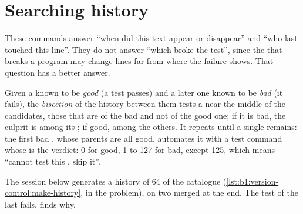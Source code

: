 \section{Searching history}\label{sec:b1:version-control:history}

\label{out:b1:version-control:search}

These commands answer ``when did this text appear or disappear'' and ``who last touched this line''. They do not answer
``which  broke the test'', since the  that breaks a program may change lines far from where the failure
shows. That question has a better answer.

\begin{definition}\label{def:b1:version-control:bisection}
Given a  known to be \emph{good} (a test passes) and a later one known to be \emph{bad} (it fails), the
\emph{bisection} of the history between them tests a  near the middle of the
candidates, those that are  of the bad  and not of the good one; if it is bad, the culprit is among its
; if good, among the others. It repeats until a single  remains: the first bad , whose parents are
all good.  automates it with a test command whose  is the verdict: 0 for good, 1 to 127
for bad, except 125, which means ``cannot test this , skip it''.
\end{definition}

The session below generates a history of 64  of the catalogue (\cref{lst:b1:version-control:make-history}, in the
problem), on two  merged at the end. The test  of the last  fails.  finds why.

